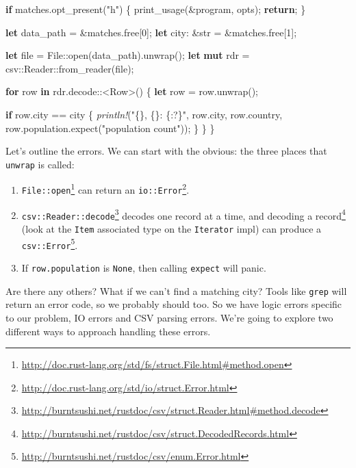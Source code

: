 \documentclass[a4paper,]{book}
\newenvironment{Shaded}{\begin{snugshade}}{\end{snugshade}}
\newcommand{\KeywordTok}[1]{\textcolor[rgb]{0.13,0.29,0.53}{\textbf{{#1}}}}
\newcommand{\DataTypeTok}[1]{\textcolor[rgb]{0.13,0.29,0.53}{{#1}}}
\newcommand{\DecValTok}[1]{\textcolor[rgb]{0.00,0.00,0.81}{{#1}}}
\newcommand{\StringTok}[1]{\textcolor[rgb]{0.31,0.60,0.02}{{#1}}}
\newcommand{\PreprocessorTok}[1]{\textcolor[rgb]{0.56,0.35,0.01}{\textit{{#1}}}}
\newcommand{\NormalTok}[1]{{#1}}
\renewcommand{\href}[2]{#2\footnote{\url{#1}}}
\providecommand{\tightlist}{%
  \setlength{\itemsep}{0pt}\setlength{\parskip}{0pt}}
\begin{document}
\begin{Shaded}
\begin{Highlighting}[]
    \KeywordTok{if} \NormalTok{matches.opt_present(}\StringTok{"h"}\NormalTok{) \{}
        \NormalTok{print_usage(&program, opts);}
        \KeywordTok{return}\NormalTok{;}
    \NormalTok{\}}

    \KeywordTok{let} \NormalTok{data_path = &matches.free[}\DecValTok{0}\NormalTok{];}
    \KeywordTok{let} \NormalTok{city: &}\DataTypeTok{str} \NormalTok{= &matches.free[}\DecValTok{1}\NormalTok{];}

    \KeywordTok{let} \NormalTok{file = File::open(data_path).unwrap();}
    \KeywordTok{let} \KeywordTok{mut} \NormalTok{rdr = csv::Reader::from_reader(file);}

    \KeywordTok{for} \NormalTok{row }\KeywordTok{in} \NormalTok{rdr.decode::<Row>() \{}
        \KeywordTok{let} \NormalTok{row = row.unwrap();}

        \KeywordTok{if} \NormalTok{row.city == city \{}
            \PreprocessorTok{println!}\NormalTok{(}\StringTok{"\{\}, \{\}: \{:?\}"}\NormalTok{,}
                \NormalTok{row.city, row.country,}
                \NormalTok{row.population.expect(}\StringTok{"population count"}\NormalTok{));}
        \NormalTok{\}}
    \NormalTok{\}}
\NormalTok{\}}
\end{Highlighting}
\end{Shaded}

Let's outline the errors. We can start with the obvious: the three
places that \texttt{unwrap} is called:

\begin{enumerate}
\def\labelenumi{\arabic{enumi}.}
\tightlist
\item
  \href{http://doc.rust-lang.org/std/fs/struct.File.html\#method.open}{\texttt{File::open}}
  can return an
  \href{http://doc.rust-lang.org/std/io/struct.Error.html}{\texttt{io::Error}}.
\item
  \href{http://burntsushi.net/rustdoc/csv/struct.Reader.html\#method.decode}{\texttt{csv::Reader::decode}}
  decodes one record at a time, and
  \href{http://burntsushi.net/rustdoc/csv/struct.DecodedRecords.html}{decoding
  a record} (look at the \texttt{Item} associated type on the
  \texttt{Iterator} impl) can produce a
  \href{http://burntsushi.net/rustdoc/csv/enum.Error.html}{\texttt{csv::Error}}.
\item
  If \texttt{row.population} is \texttt{None}, then calling
  \texttt{expect} will panic.
\end{enumerate}

Are there any others? What if we can't find a matching city? Tools like
\texttt{grep} will return an error code, so we probably should too. So
we have logic errors specific to our problem, IO errors and CSV parsing
errors. We're going to explore two different ways to approach handling
these errors.
\end{document}
